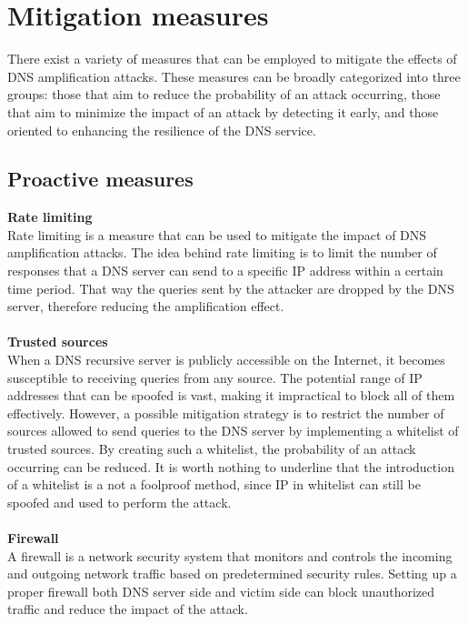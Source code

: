 \section{Mitigation measures}
There exist a variety of measures that can be employed to mitigate the effects of DNS amplification attacks. 
These measures can be broadly categorized into three groups: those that aim to reduce the probability of an attack occurring, 
those that aim to minimize the impact of an attack by detecting it early, and those oriented to enhancing the resilience of the DNS service.

\subsection{Proactive measures}
\textbf{Rate limiting}\\
Rate limiting is a measure that can be used to mitigate the impact of DNS amplification attacks. The idea behind rate limiting is to limit 
the number of responses that a DNS server can send to a specific IP address within a certain time period. That way the queries sent
by the attacker are dropped by the DNS server, therefore reducing the amplification effect.\\
\\
\textbf{Trusted sources}\\
When a DNS recursive server is publicly accessible on the Internet, it becomes susceptible to receiving queries from any source. 
The potential range of IP addresses that can be spoofed is vast, making it impractical to block all of them effectively. However, a 
possible mitigation strategy is to restrict the number of sources allowed to send queries to the DNS server by implementing a whitelist of trusted 
sources. By creating such a whitelist, the probability of an attack occurring can be reduced. It is worth nothing to underline that 
the introduction of a whitelist is a not a foolproof method, since IP in whitelist can still be spoofed and used to perform the attack.\\
\\
\textbf{Firewall}\\
A firewall is a network security system that monitors and controls the incoming and outgoing network traffic based on predetermined security
rules. Setting up a proper firewall both DNS server side and victim side can block unauthorized traffic and reduce the impact of the attack.

